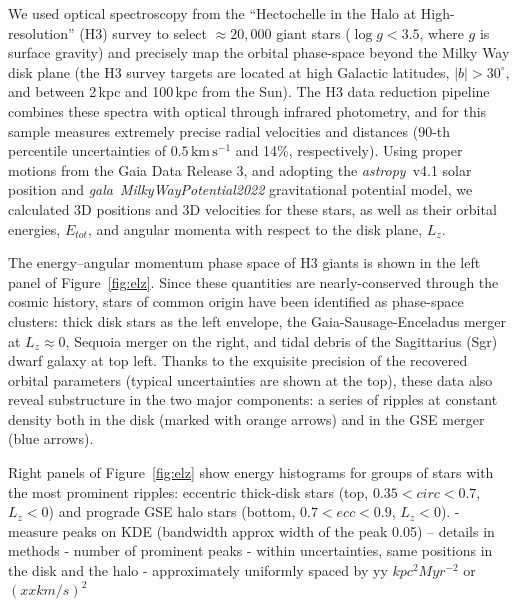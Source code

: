 \documentclass{natureprintstyle}
\newcommand{\kms}{\ensuremath{\textrm{km}\,\textrm{s}^{-1}}}
\newcommand{\package}[1]{\textsl{#1}}
\begin{document}
We used optical spectroscopy from the ``Hectochelle in the Halo at High-resolution'' (H3) survey\cite{conroy:2019} to select $\approx20,000$ giant stars ($\log g<3.5$, where $g$ is surface gravity) and precisely map the orbital phase-space beyond the Milky Way disk plane (the H3 survey targets are located at high Galactic latitudes, $|b|>30^\circ$, and between 2\,kpc and 100\,kpc from the Sun).
The H3 data reduction pipeline\cite{cargile:2020} combines these spectra with optical through infrared photometry, and for this sample measures extremely precise radial velocities and distances (90-th percentile uncertainties of $0.5\,\kms$ and 14\%, respectively).
Using proper motions from the Gaia Data Release 3\cite{gaiaedr3}, and adopting the \package{astropy}~v4.1 solar position\cite{astropy:2022} and \package{gala}~\package{MilkyWayPotential2022} gravitational potential model\cite{gala}, we calculated 3D positions and 3D velocities for these stars, as well as their orbital energies, $E_{tot}$, and angular momenta with respect to the disk plane, $L_z$.

The energy--angular momentum phase space of H3 giants is shown in the left panel of Figure~\ref{fig:elz}.
Since these quantities are nearly-conserved through the cosmic history, stars of common origin have been identified as phase-space clusters: thick disk stars as the left envelope, the Gaia-Sausage-Enceladus merger\cite{belokurov:2018,helmi:2018} at $L_z\approx0$, Sequoia merger\cite{myeong:2019,naidu:2020} on the right, and tidal debris of the Sagittarius (Sgr) dwarf galaxy\cite{ibata:2001,johnson:2020} at top left.
Thanks to the exquisite precision of the recovered orbital parameters (typical uncertainties are shown at the top), these data also reveal substructure in the two major components: a series of ripples at constant density both in the disk (marked with orange arrows) and in the GSE merger (blue arrows).

Right panels of Figure~\ref{fig:elz} show energy histograms for groups of stars with the most prominent ripples: eccentric thick-disk stars (top, $0.35<circ<0.7$, $L_z<0$) and prograde GSE halo stars (bottom, $0.7<ecc<0.9$, $L_z<0$).
- measure peaks on KDE (bandwidth approx width of the peak 0.05) -- details in methods
- number of prominent peaks
- within uncertainties, same positions in the disk and the halo
- approximately uniformly spaced by yy $kpc^2 Myr^{-2}$ or $(xx km/s)^2$
\end{document}
